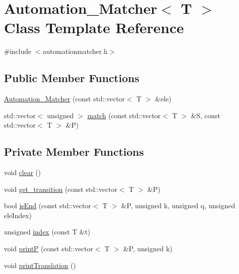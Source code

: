 \hypertarget{class_automation___matcher}{}\section{Automation\+\_\+\+Matcher$<$ T $>$ Class Template Reference}
\label{class_automation___matcher}


{\ttfamily \#include $<$automationmatcher.\+h$>$}

\subsection*{Public Member Functions}
\begin{DoxyCompactItemize}
\item 
\hyperlink{class_automation___matcher_a818a0df5478849f26cf9b2f20a1774b3}{Automation\+\_\+\+Matcher} (const std\+::vector$<$ T $>$ \&ele)
\item 
std\+::vector$<$ unsigned $>$ \hyperlink{class_automation___matcher_ae1b8ad0f17937da89b65317c10ed6c50}{match} (const std\+::vector$<$ T $>$ \&S, const std\+::vector$<$ T $>$ \&P)
\end{DoxyCompactItemize}
\subsection*{Private Member Functions}
\begin{DoxyCompactItemize}
\item 
void \hyperlink{class_automation___matcher_a2e86ddd1f79e2010d88b7fed4134ab62}{clear} ()
\item 
void \hyperlink{class_automation___matcher_ae8f903cf93f423bf6b5e607a0c683d22}{get\+\_\+transition} (const std\+::vector$<$ T $>$ \&P)
\item 
bool \hyperlink{class_automation___matcher_afb0fcb2027c0408ced759b23db742a34}{is\+End} (const std\+::vector$<$ T $>$ \&P, unsigned k, unsigned q, unsigned ele\+Index)
\item 
unsigned \hyperlink{class_automation___matcher_a9500e82ee94303a0bfb2102931e7c378}{index} (const T \&t)
\item 
void \hyperlink{class_automation___matcher_a43fa3ed5757fcb90a3d07597613b284b}{print\+P} (const std\+::vector$<$ T $>$ \&P, unsigned k)
\item 
void \hyperlink{class_automation___matcher_af6f9f34d905659a5c8a02f7903fa5aeb}{print\+Translation} ()
\end{DoxyCompactItemize}
